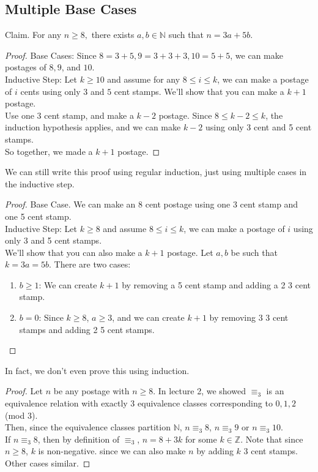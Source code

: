 \documentclass{article}
\begin{document}
\subsection{Multiple Base Cases}
Claim. For any $n \geq 8,$ there exists $a, b \in \mathbb{N}$ such that $n = 3a + 5b$.
\begin{proof}
Base Cases: Since $8 = 3 + 5, 9 = 3 + 3 + 3, 10 = 5 + 5$, we can make postages of $8,9$, and $10$.\\
Inductive Step: Let $k \geq 10$ and assume for any $8 \leq i \leq k$, we can make a postage of $i$ cents using only $3$ and $5$ cent stamps. We'll show that you can make a $k + 1$ postage.\\
Use one 3 cent stamp, and make a $k - 2$ postage. Since $8 \leq k - 2 \leq k$, the induction hypothesis applies, and we can make $k - 2$ using only 3 cent and 5 cent stamps.\\
So together, we made a $k + 1$ postage.
\end{proof}
We can still write this proof using regular induction, just using multiple cases in the inductive step.
\begin{proof}
Base Case. We can make an 8 cent postage using one 3 cent stamp and one 5 cent stamp.\\
Inductive Step: Let $k \geq 8$ and assume $8 \leq i \leq k$, we can make a postage of $i$ using only 3 and 5 cent stamps.\\
We'll show that you can also make a $k + 1$ postage. Let $a, b$ be such that $k = 3a = 5b$. There are two cases:
\begin{enumerate}
    \item $b \geq 1$: We can create $k + 1$ by removing a 5 cent stamp and adding a 2 3 cent stamp.
    \item $b = 0$: Since $k \geq 8$, $a \geq 3$, and we can create $k + 1$ by removing 3 3 cent stamps and adding 2 5 cent stamps.
\end{enumerate}
\end{proof}
In fact, we don't even prove this using induction.
\begin{proof}
Let $n$ be any postage with $n \geq 8$. In lecture 2, we showed $\equiv_3$ is an equivalence relation with exactly 3 equivalence classes corresponding to $0, 1, 2$ (mod 3).\\
Then, since the equivalence classes partition $\mathbb{N}$, $n \equiv_3 8$, $n \equiv_3 9$ or $n \equiv_3 10$.\\
If $n \equiv_3 8$, then by definition of $\equiv_3$, $n = 8 + 3k$ for some $k \in \mathbb{Z}$. Note that since $n \geq 8$, $k$ is non-negative. since we can also make $n$ by adding $k$ 3 cent stamps.\\
Other cases similar.
\end{proof}
\end{document}
